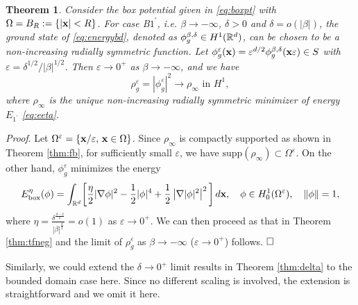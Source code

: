 \documentclass{elsarticle}
\newcommand{\vep}{\varepsilon}
\newcommand{\be}{\begin{equation}}
\newcommand{\ee}{\end{equation}}
\newtheorem{theorem}{Theorem}[section]
\newcommand{\bx}{{\bf x} }
\begin{document}
\begin{theorem}
Consider the box potential given in \eqref{eq:boxpt} with $\Omega=B_R:=\{|\bx|<R\}$. For case B$1^\prime$, i.e. $\beta\to-\infty$, $\delta>0$ and $\delta=o(|\beta|)$, %
the ground state of \eqref{eq:energybd}, denoted as $\phi_g^{\beta,\delta}\in H^1(\Bbb R^d)$, can be chosen to be a non-increasing radially symmetric function.
Let $\phi_g^\vep(\bx)=\vep^{d/2}\phi_g^{\beta,\delta}(\bx\vep)\in S$
with $\varepsilon=\delta^{1/2}/|\beta|^{1/2}$. Then $\vep\to0^+$ as $\beta\to-\infty$,
and we have
\be
\rho_g^\vep=|\phi_g^\vep|^2\to \rho_{\infty} \text{ in } H^1,
\ee
where $\rho_\infty$ is the unique non-increasing radially symmetric minimizer of energy $E_{1^\prime}$ \eqref{eq:eeta}.
\end{theorem}
{\noindent\it Proof}.
 Let $\Omega^\vep=\{\bx/\vep,\,\bx\in\Omega\}$.
Since $\rho_\infty$ is compactly supported as shown in Theorem \ref{thm:fb}, for sufficiently small $\vep$, we have $\text{supp}(\rho_\infty)\subset \Omega^\vep$.
On the other hand,  $\phi_g^\vep$ minimizes the energy
\be
E_{\rm box}^\eta(\phi)=\int_{\Bbb R^d}\biggl[
\frac{\eta}{2}|\nabla\phi|^2-\frac{1}{2}|\phi|^4+\frac{1}{2}\left|\nabla|\phi|^2\right|^2\biggl]\,d\bx,\quad \phi\in H_0^1(\Omega^\vep),\quad \|\phi\|=1,
\ee
where $\eta=\frac{\delta^{\frac{d-2}{2}}}{|\beta|^{\frac{d}{2}}}=o(1)$ as $\vep\to0^+$.  We can then proceed as that in Theorem \ref{thm:tfneg} and
the limit of $\rho_g^\vep$ as $\beta\to-\infty$ ($\vep\to0^+$) follows. $\hfill\Box$

Similarly, we could extend the $\delta\to0^+$ limit results in Theorem \ref{thm:delta} to the bounded domain case here. Since no different scaling  is involved, the extension is
straightforward and we omit it here.
\end{document}
